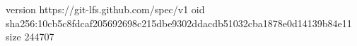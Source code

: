 version https://git-lfs.github.com/spec/v1
oid sha256:10cb5c8fdcaf205692698c215dbe9302ddacdb51032cba1878e0d14139b84e11
size 244707
